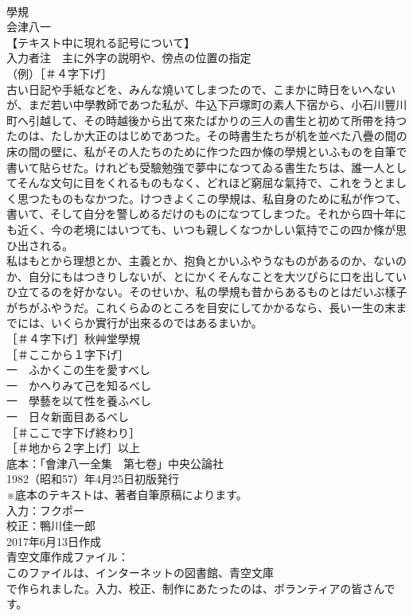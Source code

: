 \documentclass[8pt]{extreport}
\begin{document}
\begin{CJK}{UTF8}{min}
\\	學規
\\	会津八一
\\	【テキスト中に現れる記号について】
\\	入力者注　主に外字の説明や、傍点の位置の指定
\\	（例）［＃４字下げ］
\\	古い日記や手紙などを、みんな燒いてしまつたので、こまかに時日をいへないが、まだ若い中學教師であつた私が、牛込下戸塚町の素人下宿から、小石川豐川町へ引越して、その時越後から出て來たばかりの三人の書生と初めて所帶を持つたのは、たしか大正のはじめであつた。その時書生たちが机を並べた八疊の間の床の間の壁に、私がその人たちのために作つた四か條の學規といふものを自筆で書いて貼らせた。けれども受驗勉強で夢中になつてゐる書生たちは、誰一人としてそんな文句に目をくれるものもなく、どれほど窮屈な氣持で、これをうとましく思つたものもなかつた。けつきよくこの學規は、私自身のために私が作つて、書いて、そして自分を警しめるだけのものになつてしまつた。それから四十年にも近く、今の老境にはいつても、いつも親しくなつかしい氣持でこの四か條が思ひ出される。
\\	私はもとから理想とか、主義とか、抱負とかいふやうなものがあるのか、ないのか、自分にもはつきりしないが、とにかくそんなことを大ツぴらに口を出していひ立てるのを好かない。そのせいか、私の學規も昔からあるものとはだいぶ樣子がちがふやうだ。これくらゐのところを目安にしてかかるなら、長い一生の末までには、いくらか實行が出來るのではあるまいか。
\\	［＃４字下げ］秋艸堂學規
\\	［＃ここから１字下げ］
\\	一　ふかくこの生を愛すべし
\\	一　かへりみて己を知るべし
\\	一　學藝を以て性を養ふべし
\\	一　日々新面目あるべし
\\	［＃ここで字下げ終わり］
\\	［＃地から２字上げ］以上
\\	底本：「會津八一全集　第七卷」中央公論社
\\	1982（昭和57）年4月25日初版発行
\\	※底本のテキストは、著者自筆原稿によります。
\\	入力：フクポー
\\	校正：鴨川佳一郎
\\	2017年6月13日作成
\\	青空文庫作成ファイル：
\\	このファイルは、インターネットの図書館、青空文庫
\\	で作られました。入力、校正、制作にあたったのは、ボランティアの皆さんです。
\end{CJK}
\end{document}
